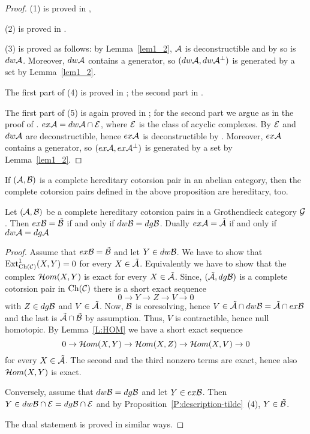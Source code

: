  \begin{proof}
  (1) is proved in \cite[Proposition 3.2]{G4},

  (2) is proved in \cite[Proposition 4.4]{G4}.

  (3) is proved as follows: by Lemma~\ref{lem1_2}, $\mathcal{A}$ is deconstructible and by \cite[Theorem 4.2]{St10-deconstr} so is $dw\mathcal{A}$. Moreover, $dw\mathcal{A}$ contains a generator, so $(dw\mathcal{A},dw\mathcal{A}^\perp)$ is generated by a set by Lemma~\ref{lem1_2}.

  The first part of (4) is proved in \cite[Proposition 3.3]{G4}; the second part in \cite[Proposition 4.6]{G4}.

  The first part of (5) is again proved in \cite[Proposition 3.3]{G4}; for the second part we argue as in the proof of \cite[Proposition 7.3]{G6}. $ex\mathcal{A}=dw\mathcal{A}\cap \mathcal{E}$, where $\mathcal{E}$ is the class of acyclic complexes. By \cite[Theorem 4.2]{St10-deconstr} $\mathcal{E}$ and $dw \mathcal{A}$ are deconstructible, hence $ex\mathcal{A}$ is deconstructible by \cite[Proposition 2.9]{St10-deconstr}.
  Moreover, $ex\mathcal{A}$ contains a generator, so $(ex\mathcal{A},ex\mathcal{A}^\perp)$ is generated by a set by Lemma~\ref{lem1_2}.
  \end{proof}

%
%
%
%
%
%
%
%
%
%
%

%
%
%
%
%

\begin{rem} If $(\mathcal{A}, \mathcal{B})$ is a complete hereditary cotorsion pair in an abelian category, then the complete cotorsion pairs defined in the above proposition are hereditary, too.
\end{rem}

\begin{lem}\label{L:ex-tilde} Let $(\mathcal{A}, \mathcal{B})$ be a complete hereditary cotorsion pairs in a Grothendieck category $\mathcal{G}$. Then $ex\mathcal{B}=\tilde {\mathcal{B}}$ if and only if $dw\mathcal{B}=dg\mathcal{B}$.
Dually $ex\mathcal{A}= \tilde {\mathcal{A}}$ if and only if $dw\mathcal{A}=dg\mathcal{A}$
 \end{lem}
  \begin{proof} Assume that $ex\mathcal{B}= \tilde {\mathcal{B}}$ and let $Y\in dw\mathcal{B}$. We have to show that $\operatorname{Ext}^1_{\mathrm{Ch}(\mathcal{C})}(X, Y)=0$ for every $X\in \tilde {\mathcal{A}}$.  Equivalently we have to show that the complex $\mathcal{H}\mathnormal{om}(X, Y)$ is exact  for every $X\in \tilde {\mathcal{A}}$. Since, $(\tilde{\mathcal{A}}, dg\mathcal{B})$ is a complete cotorsion pair in $\mathrm{Ch}(\mathcal{C})$  there is a short exact sequence
\[ 0\to Y\to Z\to V\to 0\]
with $Z\in dg\mathcal{B}$ and $V\in \tilde{\mathcal{A}}$. Now, $\mathcal{B}$ is coresolving,  hence $V\in \tilde{\mathcal{A}}\cap dw\mathcal{B}=\tilde{\mathcal{A}}\cap ex\mathcal{B}$ and the last is $\tilde{\mathcal{A}}\cap \tilde{\mathcal{B}}$ by  assumption. Thus, $V$ is contractible, hence null homotopic.
By Lemma~\ref{L:HOM} we have a short exact sequence
\[0\to \mathcal{H}\mathnormal{om}(X, Y)\to  \mathcal{H}\mathnormal{om}(X, Z)\to \mathcal{H}\mathnormal{om}(X, V)\to 0\]
for every $X\in \tilde {\mathcal{A}}$. The second and the third nonzero terms are exact, hence also $ \mathcal{H}\mathnormal{om}(X, Y)$ is exact.

Conversely, assume that $dw\mathcal{B}=dg\mathcal{B}$ and let $Y\in ex\mathcal{B}$. Then $Y\in dw\mathcal{B}\cap\mathcal{E}=dg\mathcal{B}\cap \mathcal{E}$ and by Proposition~\ref{P:description-tilde}~(4), $Y\in \tilde{\mathcal{B}}$.
%
%
%
%
%
%

The dual statement is proved in similar ways.
\end{proof}


